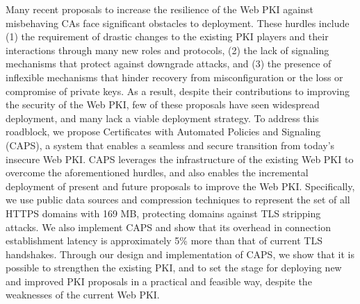 Many recent proposals to increase the resilience of the Web PKI against
misbehaving CAs face significant obstacles to deployment. These hurdles include
(1) the requirement of drastic changes to the existing PKI players and their
interactions through many new roles and protocols, (2) the lack of signaling
mechanisms that protect against downgrade attacks, and (3) the presence of
inflexible mechanisms that hinder recovery from misconfiguration or the loss or
compromise of private keys. As a result, despite their contributions to
improving the security of the Web PKI, few of these proposals have seen
widespread deployment, and many lack a viable deployment strategy. To address
this roadblock, we propose Certificates with Automated Policies and Signaling
(CAPS), a system that enables a seamless and secure transition from today's
insecure Web PKI. CAPS leverages the infrastructure of the existing Web PKI to
overcome the aforementioned hurdles, and also enables the incremental deployment
of present and future proposals to improve the Web PKI. Specifically, we use
public data sources and compression techniques to represent the set of all HTTPS
domains with 169 MB, protecting domains against TLS stripping attacks. We also
implement CAPS and show that its overhead in connection establishment latency is
approximately 5\% more than that of current TLS handshakes. Through our design
and implementation of CAPS, we show that it is possible to strengthen the
existing PKI, and to set the stage for deploying new and improved PKI proposals
in a practical and feasible way, despite the weaknesses of the current Web PKI.
